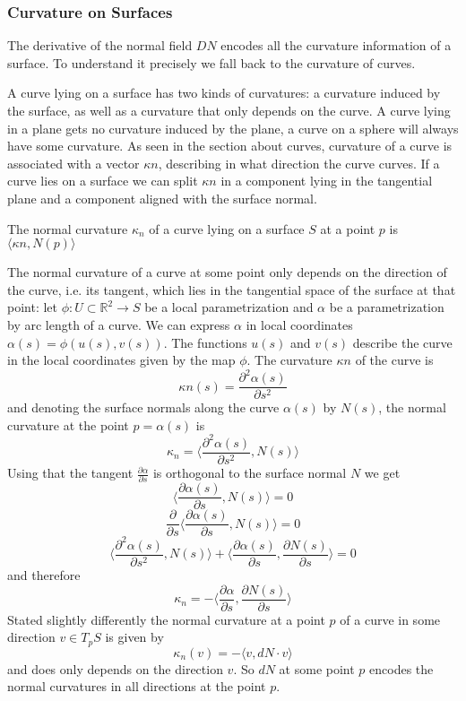 \subsubsection{Curvature on Surfaces}
The derivative of the normal field $DN$ encodes all the curvature information of a surface. To understand it precisely we fall back to the curvature of curves.

A curve lying on a surface has two kinds of curvatures: a curvature induced by the surface, as well as a curvature that only depends on the curve. A curve lying in a plane gets no curvature induced by the plane, a curve on a sphere will always have some curvature. As seen in the section about curves, curvature of a curve is associated with a vector $\kappa n$, describing in what direction the curve curves. If a curve lies on a surface we can split $\kappa n$ in a component lying in the tangential plane and a component aligned with the surface normal.

\begin{definition} The normal curvature $\kappa_n$ of a curve lying on a surface $S$ at a point $p$ is $\langle \kappa n, N(p)\rangle$ 
\end{definition}
The normal curvature of a curve at some point only depends on the direction of the curve, i.e. its tangent, which lies in the tangential space of the surface at that point:
let $\phi: U \subset \mathbb R^2 \rightarrow S$ be a local parametrization and $\alpha$ be a parametrization by arc length of a curve. We can express $\alpha$ in local coordinates $\alpha(s) = \phi(u(s), v(s))$.  The functions $u(s)$ and $v(s)$ describe the curve in the local coordinates given by the map $\phi$. The curvature $\kappa n$ of the curve is 
\[\kappa n(s) = \frac{\partial^2 \alpha(s)}{\partial s^2}\]
and denoting the surface normals along the curve $\alpha(s)$ by $N(s)$, the normal curvature at the point $p = \alpha(s)$ is 
\[\kappa_n = \langle\frac{\partial^2 \alpha(s)}{\partial s^2}, N(s)\rangle\]
Using that the tangent $\frac{\partial \alpha}{\partial s}$ is orthogonal to the surface normal $N$ we get
\[\langle\frac{\partial \alpha(s)}{\partial s}, N(s)\rangle = 0 \]
\[ \frac{\partial}{\partial s} \langle\frac{\partial \alpha(s)}{\partial s}, N(s)\rangle = 0\]
\[\langle\frac{\partial^2 \alpha(s)}{\partial s^2}, N(s)\rangle + \langle\frac{\partial \alpha(s)}{\partial s}, \frac{\partial N(s)}{\partial s}\rangle  = 0\]
and therefore 
\[\kappa_n = -\langle\frac{\partial \alpha}{\partial s}, \frac{\partial N(s)}{\partial s}\rangle\]
Stated slightly differently the normal curvature at a point $p$ of a curve in some direction $v \in T_pS$ is given by
\[\kappa_n(v) =  -\langle v, dN \cdot v\rangle \]
and does only depends on the direction $v$. So $dN$ at some point $p$ encodes the normal curvatures in all directions at the point $p$.


